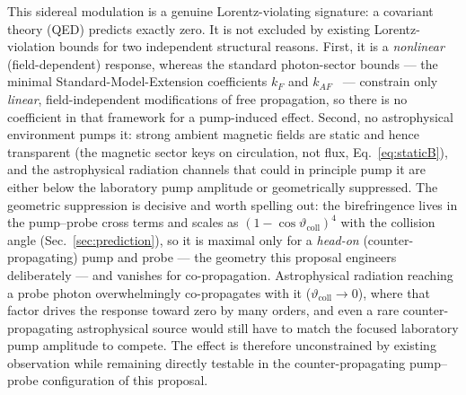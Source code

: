 \documentclass[aps,prd,twocolumn,superscriptaddress,nofootinbib,longbibliography]{revtex4-2}
\begin{document}
This sidereal modulation is a genuine Lorentz-violating signature: a covariant
theory (QED) predicts exactly zero. It is not excluded by existing
Lorentz-violation bounds for two independent structural reasons. First, it is a
\emph{nonlinear} (field-dependent) response, whereas the standard photon-sector
bounds --- the minimal Standard-Model-Extension coefficients $k_F$ and
$k_{AF}$~\cite{KosteleckyRussell2011} --- constrain only \emph{linear},
field-independent modifications of free propagation, so there is no coefficient in
that framework for a pump-induced effect. Second, no astrophysical environment
pumps it: strong ambient magnetic fields are static and hence transparent (the
magnetic sector keys on circulation, not flux, Eq.~\eqref{eq:staticB}), and the
astrophysical radiation channels that could in principle pump it are either below
the laboratory pump amplitude or geometrically suppressed. The geometric
suppression is decisive and worth spelling out: the birefringence lives in the
pump--probe cross terms and scales as $(1-\cos\vartheta_{\mathrm{coll}})^4$ with
the collision angle (Sec.~\ref{sec:prediction}), so it is maximal only for a
\emph{head-on} (counter-propagating) pump and probe --- the geometry this proposal
engineers deliberately --- and vanishes for co-propagation. Astrophysical
radiation reaching a probe photon overwhelmingly co-propagates with it
($\vartheta_{\mathrm{coll}}\to0$), where that factor drives the response toward
zero by many orders, and even a rare counter-propagating astrophysical source
would still have to match the focused laboratory pump amplitude to compete. The
effect is therefore unconstrained by existing observation while remaining directly
testable in the counter-propagating pump--probe configuration of this proposal.
\end{document}
